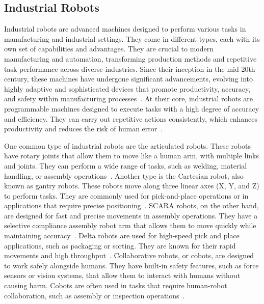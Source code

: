 \subsection{Industrial Robots}\label{IR}
Industrial robots are advanced machines designed to perform various tasks in manufacturing and industrial settings. They come in different types, each with its own set of capabilities and advantages. They are crucial to modern manufacturing and automation, transforming production methods and repetitive task performance across diverse industries. Since their inception in the mid-20th century, these machines have undergone significant advancements, evolving into highly adaptive and sophisticated devices that promote productivity, accuracy, and safety within manufacturing processes~\cite{Ji.2019}.
At their core, industrial robots are programmable machines designed to execute tasks with a high degree of accuracy and efficiency. They can carry out repetitive actions consistently, which enhances productivity and reduces the risk of human error~\cite{Siciliano.2016}. 



One common type of industrial robots are the articulated robots. These robots have rotary joints that allow them to move like a human arm, with multiple links and joints. They can perform a wide range of tasks, such as welding, material handling, or assembly operations~\cite{Hanafusa.1981, Jain.2019}. Another type is the Cartesian robot, also known as gantry robots. These robots move along three linear axes (X, Y, and Z) to perform tasks. They are commonly used for pick-and-place operations or in applications that require precise positioning~\cite{Kim.2003}. SCARA robots, on the other hand, are designed for fast and precise movements in assembly operations. They have a selective compliance assembly robot arm that allows them to move quickly while maintaining accuracy~\cite{Das.2005}. Delta robots are used for high-speed pick and place applications, such as packaging or sorting. They are known for their rapid movements and high throughput~\cite{bonev2001delta}. Collaborative robots, or cobots, are designed to work safely alongside humans. They have built-in safety features, such as force sensors or vision systems, that allow them to interact with humans without causing harm. Cobots are often used in tasks that require human-robot collaboration, such as assembly or inspection operations~\cite{Liu.2022b}.


